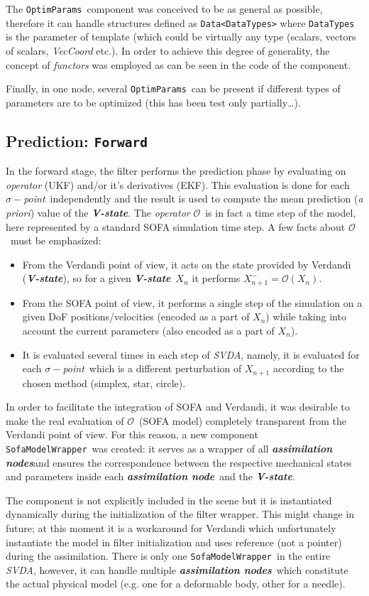 \documentclass[10pt]{article}
\def\op{$\mathcal{O}$}
\def\asn{\textit{\textbf{assimilation node}}}
\def\asns{\textit{\textbf{assimilation nodes}}}
\def\vstate{\textit{\textbf{V-state}}}
\def\svda{\textit{SVDA}}
\def\smp{$\sigma-$\textit{point}}
\def\smw{\texttt{SofaModelWrapper}}
\def\opr{\texttt{OptimParams}}
\begin{document}
The \opr\ component was conceived to be as general as possible, therefore it can handle structures defined as \texttt{Data<DataTypes>} where \texttt{DataTypes} is the parameter of template (which could be virtually any type (scalars, vectors of scalars, \emph{VecCoord} etc.). In order to achieve this degree of generality, the concept of \emph{functors} was employed as can be seen in the code of the component. 

Finally, in one node, several  \opr\ can be present if different types of parameters are to be optimized (this has been test only partially\ldots).

\subsection{Prediction: \texttt{Forward}}
In the forward stage, the filter performs the prediction phase by evaluating on \emph{operator} (UKF) and/or it's derivatives (EKF). This evaluation is done for each \smp\ independently and the 
result is used to compute the mean prediction (\emph{a priori}) value of the \vstate. The \emph{operator} \op\ is in fact a time step of the model, here represented by a standard SOFA simulation time step.
A few facts about \op\ must be emphasized:
\begin{itemize}
\item From the Verdandi point of view, it acts on the state provided by Verdandi (\vstate), so for a given \vstate\ $X_n$ it performs $X^-_{n+1} = \mathcal{O}(X_{n})$.  
\item From the SOFA point of view, it performs a single step of the simulation on a given DoF positions/velocities (encoded as a part of $X_n$)  while taking into account the current parameters (also encoded as a part of $X_n$).
\item It is evaluated several times in each step of \svda, namely, it is evaluated for each \smp\ which is a different perturbation of $X_{n+1}$ according to the chosen method (simplex, star, circle). 
\end{itemize}

In order to facilitate the integration of SOFA and Verdandi, it was desirable to make the real evaluation of \op\ (SOFA model) completely transparent from the Verdandi point of view. 
For this reason, a new component \smw\  was created: it serves as a wrapper of all \asns and ensures the correspondence between the respective mechanical states and parameters 
inside each \asn\ and the \vstate.

The component is not explicitly included in the scene but it is instantiated dynamically during the initialization of the filter wrapper. 
This might change in future; at this moment it is a workaround for Verdandi which unfortunately instantiate the model in filter initialization and uses reference (not a pointer) during the assimilation.
There is only one \smw\ in the entire \svda, however, it can handle multiple \asns\ which constitute the actual physical model  (e.g. one for a deformable body, other for a needle).
\end{document}
